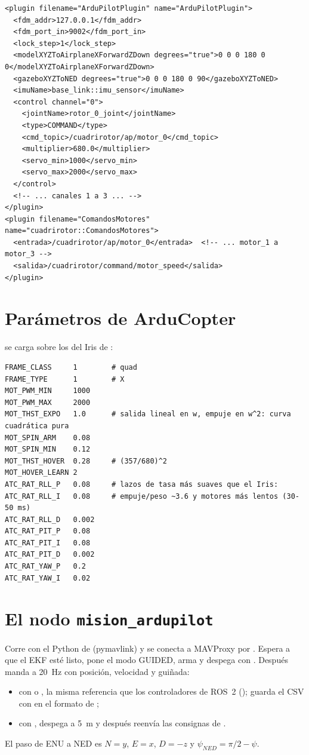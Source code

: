 \begin{lstlisting}[style=xml]
<plugin filename="ArduPilotPlugin" name="ArduPilotPlugin">
  <fdm_addr>127.0.0.1</fdm_addr>
  <fdm_port_in>9002</fdm_port_in>
  <lock_step>1</lock_step>
  <modelXYZToAirplaneXForwardZDown degrees="true">0 0 0 180 0 0</modelXYZToAirplaneXForwardZDown>
  <gazeboXYZToNED degrees="true">0 0 0 180 0 90</gazeboXYZToNED>
  <imuName>base_link::imu_sensor</imuName>
  <control channel="0">
    <jointName>rotor_0_joint</jointName>
    <type>COMMAND</type>
    <cmd_topic>/cuadrirotor/ap/motor_0</cmd_topic>
    <multiplier>680.0</multiplier>
    <servo_min>1000</servo_min>
    <servo_max>2000</servo_max>
  </control>
  <!-- ... canales 1 a 3 ... -->
</plugin>
<plugin filename="ComandosMotores" name="cuadrirotor::ComandosMotores">
  <entrada>/cuadrirotor/ap/motor_0</entrada>  <!-- ... motor_1 a motor_3 -->
  <salida>/cuadrirotor/command/motor_speed</salida>
</plugin>
\end{lstlisting}

\section{Parámetros de ArduCopter}

 se carga sobre los del Iris de :

\begin{lstlisting}
FRAME_CLASS     1        # quad
FRAME_TYPE      1        # X
MOT_PWM_MIN     1000
MOT_PWM_MAX     2000
MOT_THST_EXPO   1.0      # salida lineal en w, empuje en w^2: curva cuadrática pura
MOT_SPIN_ARM    0.08
MOT_SPIN_MIN    0.12
MOT_THST_HOVER  0.28     # (357/680)^2
MOT_HOVER_LEARN 2
ATC_RAT_RLL_P   0.08     # lazos de tasa más suaves que el Iris:
ATC_RAT_RLL_I   0.08     # empuje/peso ~3.6 y motores más lentos (30-50 ms)
ATC_RAT_RLL_D   0.002
ATC_RAT_PIT_P   0.08
ATC_RAT_PIT_I   0.08
ATC_RAT_PIT_D   0.002
ATC_RAT_YAW_P   0.2
ATC_RAT_YAW_I   0.02
\end{lstlisting}

\section{El nodo \texorpdfstring{\texttt{mision\_ardupilot}}{mision\_ardupilot}}

Corre con el Python de  (pymavlink) y se conecta a MAVProxy por
. Espera a que el EKF esté listo, pone el modo GUIDED, arma y despega con
. Después manda a 20~Hz  con posición,
velocidad y guiñada:
\begin{itemize}
  \item con  o , la misma referencia que los controladores de ROS~2
        (); guarda el CSV con  en el formato de ;
  \item con , despega a 5~m y después reenvía las consignas de
        .
\end{itemize}
El paso de ENU a NED es $N = y$, $E = x$, $D = -z$ y $\psi_{NED} = \pi/2 - \psi$.

